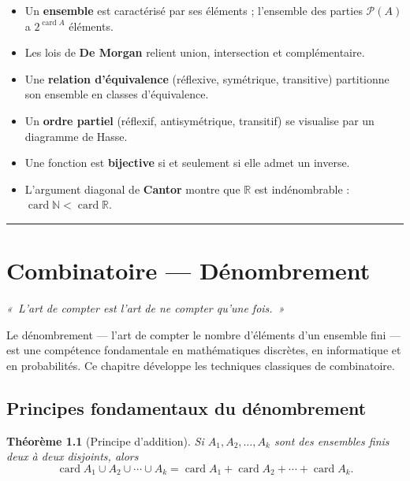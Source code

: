 \documentclass[12pt,a4paper,openany]{book}
\theoremstyle{definition}
\theoremstyle{plain}
\newtheorem{theoreme}[definition]{Théorème}
\theoremstyle{remark}
\newcommand{\N}{\mathbb{N}}
\newcommand{\R}{\mathbb{R}}
\newcommand{\powerset}{\mathcal{P}}
\DeclareMathOperator{\card}{card}
\begin{document}
\begin{itemize}
  \item Un \textbf{ensemble} est caractérisé par ses éléments ; l'ensemble des
    parties $\powerset(A)$ a $2^{\card{A}}$ éléments.
  \item Les lois de \textbf{De Morgan} relient union, intersection et complémentaire.
  \item Une \textbf{relation d'équivalence} (réflexive, symétrique, transitive)
    partitionne son ensemble en classes d'équivalence.
  \item Un \textbf{ordre partiel} (réflexif, antisymétrique, transitif) se
    visualise par un diagramme de Hasse.
  \item Une fonction est \textbf{bijective} si et seulement si elle admet un
    inverse.
  \item L'argument diagonal de \textbf{Cantor} montre que $\R$ est
    indénombrable : $\card{\N} < \card{\R}$.
\end{itemize}

\bigskip
\hrule
\bigskip


\chapter{Combinatoire --- Dénombrement}\label{ch:combinatoire}

\begin{center}
\textit{«~L'art de compter est l'art de ne compter qu'une fois.~»}
\end{center}

\bigskip

Le dénombrement --- l'art de compter le nombre d'éléments d'un ensemble fini
--- est une compétence fondamentale en mathématiques discrètes, en
informatique et en probabilités. Ce chapitre développe les techniques
classiques de combinatoire.

\section{Principes fondamentaux du dénombrement}\label{sec:principes-denombrement}

\begin{theoreme}[Principe d'addition]\label{thm:principe-addition}
Si $A_1, A_2, \ldots, A_k$ sont des ensembles finis \emph{deux à deux
disjoints}, alors
\[
  \card{A_1 \cup A_2 \cup \cdots \cup A_k}
  = \card{A_1} + \card{A_2} + \cdots + \card{A_k}.
\]
\end{theoreme}
\end{document}
